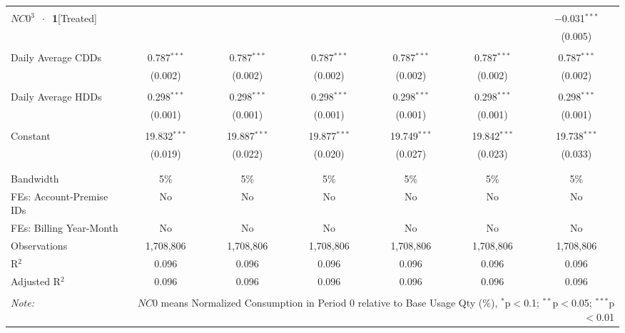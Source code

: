 \begin{table}[!htbp]
\begin{adjustbox}{scale = 0.8}
\begin{tabular}{@{\extracolsep{25pt}}lcccccc}
  & & & & & & \\ 
 $NC0^{3}$ $\ \cdot \ $ \textbf{1}[Treated] &  &  &  &  &  & $-$0.031$^{***}$ \\ 
  &  &  &  &  &  & (0.005) \\ 
  & & & & & & \\ 
 Daily Average CDDs & 0.787$^{***}$ & 0.787$^{***}$ & 0.787$^{***}$ & 0.787$^{***}$ & 0.787$^{***}$ & 0.787$^{***}$ \\ 
  & (0.002) & (0.002) & (0.002) & (0.002) & (0.002) & (0.002) \\ 
  & & & & & & \\ 
 Daily Average HDDs & 0.298$^{***}$ & 0.298$^{***}$ & 0.298$^{***}$ & 0.298$^{***}$ & 0.298$^{***}$ & 0.298$^{***}$ \\ 
  & (0.001) & (0.001) & (0.001) & (0.001) & (0.001) & (0.001) \\ 
  & & & & & & \\ 
 Constant & 19.832$^{***}$ & 19.887$^{***}$ & 19.877$^{***}$ & 19.749$^{***}$ & 19.842$^{***}$ & 19.738$^{***}$ \\ 
  & (0.019) & (0.022) & (0.020) & (0.027) & (0.023) & (0.033) \\ 
  & & & & & & \\ 
\hline \\[-1.8ex] 
Bandwidth & 5\% & 5\% & 5\% & 5\% & 5\% & 5\% \\ 
FEs: Account-Premise IDs & No & No & No & No & No & No \\ 
FEs: Billing Year-Month & No & No & No & No & No & No \\ 
Observations & 1,708,806 & 1,708,806 & 1,708,806 & 1,708,806 & 1,708,806 & 1,708,806 \\ 
R$^{2}$ & 0.096 & 0.096 & 0.096 & 0.096 & 0.096 & 0.096 \\ 
Adjusted R$^{2}$ & 0.096 & 0.096 & 0.096 & 0.096 & 0.096 & 0.096 \\ 
\hline 
\hline \\[-1.8ex] 
\textit{Note:}  & \multicolumn{6}{r}{$NC0$ means Normalized Consumption in Period 0 relative to Base Usage Qty (\%), $^{*}$p$<$0.1; $^{**}$p$<$0.05; $^{***}$p$<$0.01} \\ 
\end{tabular} 
\end{adjustbox}
\end{table} 
